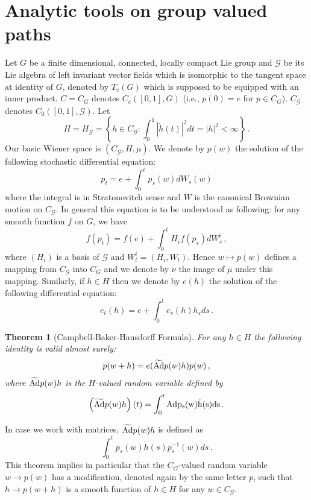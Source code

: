 \documentclass[12pt,a4paper]{book}
\newtheorem{theorem}{Theorem}[section]
\newcommand{\be}{\begin{equation}}
\newcommand{\ee}{\end{equation}}
\newcommand{\Ad}{\rm {Ad}}
\newcommand{\tA}{\widetilde{\Ad}}
\newcommand{\G}{{\mathcal G}}
\newcommand{\remark}{\noindent {\bf Remark:\ }}
\begin{document}
\section{Analytic tools on group valued paths}
Let $G$ be a finite dimensional, connected, locally compact Lie group and
$\G$ be its Lie algebra of left invariant vector fields which is isomorphic
to the tangent space at identity of $G$, denoted by $T_e(G)$ which  is
supposed to be equipped with an inner product. $C=C_G$ denotes
$C_e([0,1],G)$ (i.e., $p(0)=e$ for $p\in C_G$). $C_\G$ denotes
$C_0([0,1],\G)$. Let
$$
H=H_\G=\left\{h\in C_\G:\int_0^1 |\dot{h}(t)|^2dt=|h|^2<\infty\right\}\,.
$$
Our basic Wiener space is $(C_\G,H,\mu)$. We denote by $p(w)$ the solution
of the following stochastic differential equation:
$$
p_t=e+\int_0^t p_s(w)dW_s(w)
$$
where the integral is in Stratonovitch sense and $W$ is the canonical
Brownian motion on $C_\G$. In general this equation is to be
understood as following: for any smooth function $f$ on $G$, we have
$$
f(p_t)=f(e)+\int_0^t H_if(p_s)dW^i_s\,,
$$
where $(H_i)$ is a basis of $\G$ and $W^i_t=(H_i,W_t)$. Hence
$w\mapsto p(w)$ defines a mapping from $C_\G$ into $C_G$ and we denote
by $\nu$ the image of $\mu$ under this mapping. Similarly, if $h\in H$
then we denote by $e(h)$  the
solution of the following differential equation:
\begin{equation}
\label{e-defn}
e_t(h)=e+\int_0^t e_s(h)\dot{h}_s ds\,.
\end{equation}
\begin{theorem}[Campbell-Baker-Hausdorff Formula]
\label{C-H-formula}
For any $h\in H$ the following identity is valid
almost surely:
\be
\label{C-H-eqn}
p(w+h)=e(\tA p(w)h)p(w)\,,
\ee
where $\tA p(w)h$ is the $H$-valued random variable defined by
$$
\left(\tA p(w)h\right)(t)=\int_0^t \Ad  p_s(w)\dot{h}(s)ds\,.
$$
\end{theorem}
\index[not]{ad@${\tA}p(w)h$}
\remark
In case we work with matrices, $\tA p(w)h$ is defined as
$$
\int_0^t p_s(w)\dot{h}(s)p_s^{-1}(w)ds\,.
$$
\remark This theorem implies in particular that the $C_G$-valued
random variable $w\to p(w)$ has a modification, denoted again by the
same letter $p$, such that $h\to p(w+h)$ is a smooth function of $h\in
H$ for any $w\in C_\G$.
\end{document}
